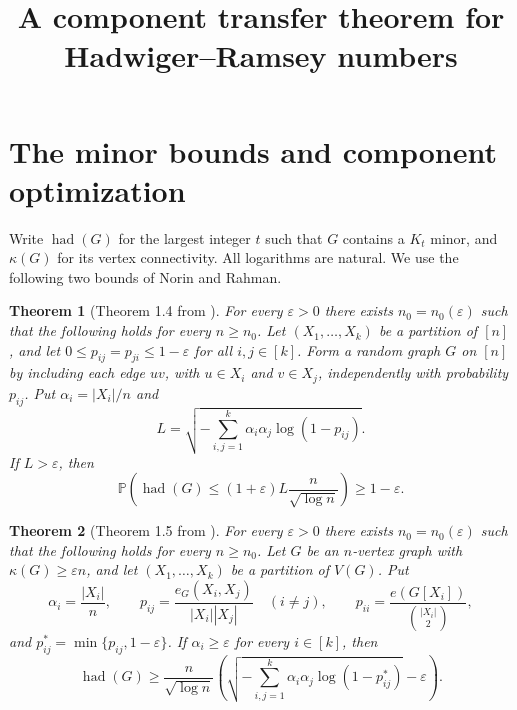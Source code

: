 \documentclass[11pt]{article}
\title{A component transfer theorem for Hadwiger--Ramsey numbers}
\author{}
\date{}
\newtheorem{theorem}{Theorem}
\newcommand{\had}{\operatorname{had}}
\begin{document}
\maketitle

\section{The minor bounds and component optimization}

Write $\had(G)$ for the largest integer $t$ such that $G$ contains a $K_t$
minor, and $\kappa(G)$ for its vertex connectivity. All logarithms are natural.
We use the following two bounds of Norin and Rahman.

\begin{theorem}[Theorem 1.4 from {\cite{norinrahman}}]\label{thm:random}
For every $\varepsilon>0$ there exists $n_0=n_0(\varepsilon)$ such that the
following holds for every $n\geq n_0$. Let $(X_1,\ldots,X_k)$ be a partition
of $[n]$, and let $0\leq p_{ij}=p_{ji}\leq1-\varepsilon$ for all
$i,j\in[k]$. Form a random graph $G$ on $[n]$ by including each edge $uv$,
with $u\in X_i$ and $v\in X_j$, independently with probability $p_{ij}$.
Put $\alpha_i=|X_i|/n$ and
\[
 L=\sqrt{-\sum_{i,j=1}^k\alpha_i\alpha_j\log(1-p_{ij})}.
\]
If $L>\varepsilon$, then
\[
 \mathbb P\left(\had(G)\leq(1+\varepsilon)L\frac{n}{\sqrt{\log n}}\right)
 \geq1-\varepsilon.
\]
\end{theorem}

\begin{theorem}[Theorem 1.5 from {\cite{norinrahman}}]\label{thm:minor}
For every $\varepsilon>0$ there exists $n_0=n_0(\varepsilon)$ such that the
following holds for every $n\geq n_0$. Let $G$ be an $n$-vertex graph with
$\kappa(G)\geq\varepsilon n$, and let $(X_1,\ldots,X_k)$ be a partition of
$V(G)$. Put
\[
 \alpha_i=\frac{|X_i|}{n},\qquad
 p_{ij}=\frac{e_G(X_i,X_j)}{|X_i||X_j|}\quad(i\ne j),\qquad
 p_{ii}=\frac{e(G[X_i])}{\binom{|X_i|}{2}},
\]
and $p_{ij}^*=\min\{p_{ij},1-\varepsilon\}$.
If $\alpha_i\geq\varepsilon$ for every $i\in[k]$, then
\[
 \had(G)\geq\frac{n}{\sqrt{\log n}}
 \left(\sqrt{-\sum_{i,j=1}^k\alpha_i\alpha_j
                    \log(1-p_{ij}^*)}-\varepsilon\right).
\]
\end{theorem}
\end{document}
